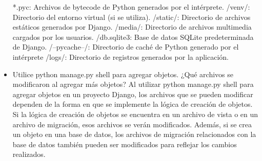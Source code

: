 \documentclass{article}
\begin{document}
\begin{itemize}
*.pyc: Archivos de bytecode de Python generados por el intérprete.\newline
/venv/: Directorio del entorno virtual (si se utiliza).\newline
/static/: Directorio de archivos estáticos generados por Django.\newline
/media/: Directorio de archivos multimedia cargados por los usuarios.\newline
/db.sqlite3: Base de datos SQLite predeterminada de Django.\newline
/--pycache--/: Directorio de caché de Python generado por el intérprete\newline
/logs/: Directorio de registros generados por la aplicación.
                \item Utilice python manage.py shell para agregar objetos. ¿Qué archivos se modificaron al agregar más objetos?\newline
                Al utilizar python manage.py shell para agregar objetos en un proyecto Django, los archivos que se pueden modificar dependen de la forma en que se implemente la lógica de creación de objetos. Si la lógica de creación de objetos se encuentra en un archivo de vista o en un archivo de migración, esos archivos se verán modificados. Además, si se crea un objeto en una base de datos, los archivos de migración relacionados con la base de datos también pueden ser modificados para reflejar los cambios realizados.
    	\end{itemize}
    
    
\end{document}

